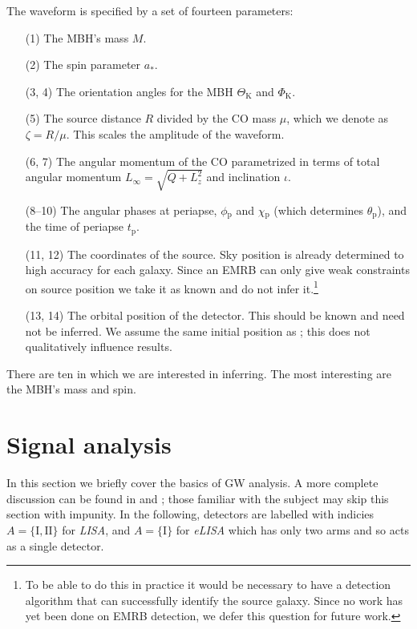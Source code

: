 \documentclass[useAMS,usedcolumn,usegraphicx,usenatbib]{mn2e}
\newcommand{\sub}[1]{\ensuremath{_\mathrm{#1}}}
\begin{document}
The waveform is specified by a set of fourteen parameters:
\begin{enumerate}
\item[(1)] The MBH's mass $M$.
\item[(2)] The spin parameter $a_\ast$.
\item[(3, 4)] The orientation angles for the MBH $\Theta\sub{K}$ and $\Phi\sub{K}$.
\item[(5)] The source distance $R$ divided by the CO mass $\mu$, which we denote as $\zeta = R/\mu$. This scales the amplitude of the waveform.
\item[(6, 7)] The angular momentum of the CO parametrized in terms of total angular momentum $L_\infty = \sqrt{Q + L_z^2}$ and inclination $\iota$.
\item[(8--10)] The angular phases at periapse, $\phi\sub{p}$  and $\chi\sub{p}$ (which determines $\theta\sub{p}$), and the time of periapse $t\sub{p}$.
\item[(11, 12)] The coordinates of the source. Sky position is already determined to high accuracy for each galaxy. Since an EMRB can only give weak constraints on source position we take it as known and do not infer it.\footnote{To be able to do this in practice it would be necessary to have a detection algorithm that can successfully identify the source galaxy. Since no work has yet been done on EMRB detection, we defer this question for future work.}
\item[(13, 14)] The orbital position of the detector. This should be known and need not be inferred. We assume the same initial position as \citet{Cutler1998}; this does not qualitatively influence results.
\end{enumerate}
There are ten in which we are interested in inferring. The most interesting are the MBH's mass and spin.

\section{Signal analysis}\label{sec:Sig}

In this section we briefly cover the basics of GW analysis. A more complete discussion can be found in \citet{Finn1992} and \citet{Cutler1994}; those familiar with the subject may skip this section with impunity. In the following, detectors are labelled with indicies $A = \{\mathrm{I}, \mathrm{II}\}$ for \textit{LISA}, and $A = \{\mathrm{I}\}$ for \textit{eLISA} which has only two arms and so acts as a single detector.
\end{document}
